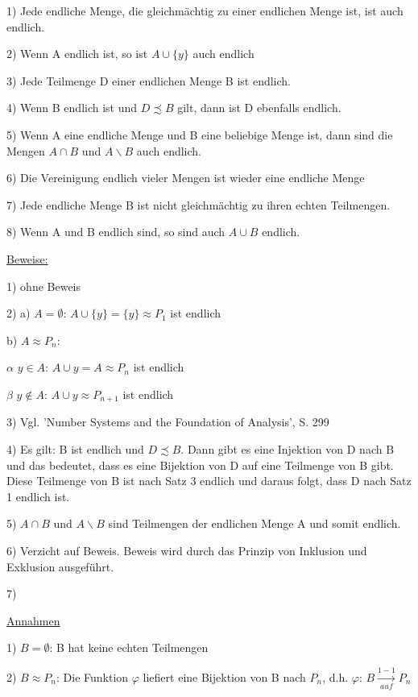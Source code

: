 \documentclass[12pt]{article}
\begin{document}
		{
			\begin{singlespace}
				1) Jede endliche Menge, die gleichmächtig zu einer endlichen Menge ist, ist auch endlich.
				
				2) Wenn A endlich ist, so ist $A \cup \{y\}$ auch endlich
				
				3) Jede Teilmenge D einer endlichen Menge B ist endlich. 
				
				4) Wenn B endlich ist und $D \precsim B$ gilt, dann ist D ebenfalls endlich.
				
				5) Wenn A eine endliche Menge und B eine beliebige Menge ist, dann sind die Mengen $A \cap B$ und $A \backslash B$ auch endlich.
				
				6) Die Vereinigung endlich vieler Mengen ist wieder eine endliche Menge
				
				7) Jede endliche Menge B ist nicht gleichmächtig zu ihren echten Teilmengen.
				
				8) Wenn A und B endlich sind, so sind auch $A \cup B$ endlich.
			\end{singlespace}
		}
		
		\underline{Beweise:}
		
		1) ohne Beweis
		
		2) a) $A = \emptyset$: $A \cup \{y\} = \{y\} \approx P_1$ ist endlich
		
		b) $A \approx P_n$: 
		
		$\alpha$ $y \in A$: $A \cup {y} = A \approx P_n$ ist endlich
		
		$\beta$ $y \not \in A$: $A \cup {y} \approx P_{n+1}$ ist endlich
		
		3) Vgl. 'Number Systems and the Foundation of Analysis',  S. 299
		
		4) Es gilt: B ist endlich und $D \precsim B$. Dann gibt es eine Injektion von D nach B und das bedeutet, dass es eine Bijektion von D auf eine 
		Teilmenge von B gibt. Diese Teilmenge von B ist nach Satz 3 endlich und daraus folgt, dass D nach Satz 1 endlich ist.
		
		5) $A \cap B$ und $A \backslash B$ sind Teilmengen der endlichen Menge A und somit endlich.
		
		6) Verzicht auf Beweis. Beweis wird durch das Prinzip von Inklusion und Exklusion ausgeführt.
		
		7) 
		
		\underline{Annahmen}
		
		1) $B = \emptyset$: B hat keine echten Teilmengen
		
		2) $B \approx P_n$: Die Funktion $\varphi$ liefiert eine Bijektion von B nach $P_n$, d.h. $\varphi$: $B \xrightarrow[auf]{1-1} P_n$
		
\end{document}
